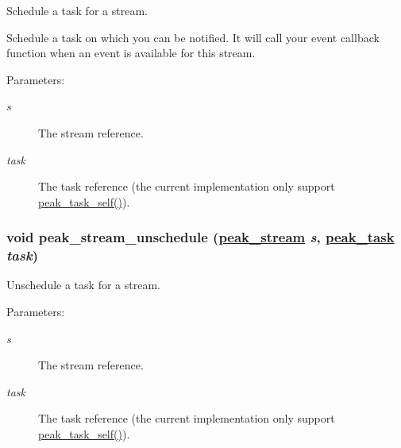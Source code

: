 Schedule a task for a stream. 

Schedule a task on which you can be notified. It will call your event callback function when an event is available for this stream.

\begin{Desc}
\item[Parameters:]
\begin{description}
\item[{\em s}]The stream reference. \item[{\em task}]The task reference (the current implementation only support \hyperlink{group__task__common_ga8}{peak\_\-task\_\-self()}). \end{description}
\end{Desc}
\hypertarget{group__stream__sched_ga1}{
\subsubsection[peak\_\-stream\_\-unschedule]{\setlength{\rightskip}{0pt plus 5cm}void peak\_\-stream\_\-unschedule (\hyperlink{group__stream_ga0}{peak\_\-stream} {\em s}, \hyperlink{group__task__common_ga0}{peak\_\-task} {\em task})}}
\label{group__stream__sched_ga1}


Unschedule a task for a stream. 

\begin{Desc}
\item[Parameters:]
\begin{description}
\item[{\em s}]The stream reference. \item[{\em task}]The task reference (the current implementation only support \hyperlink{group__task__common_ga8}{peak\_\-task\_\-self()}). \end{description}
\end{Desc}
